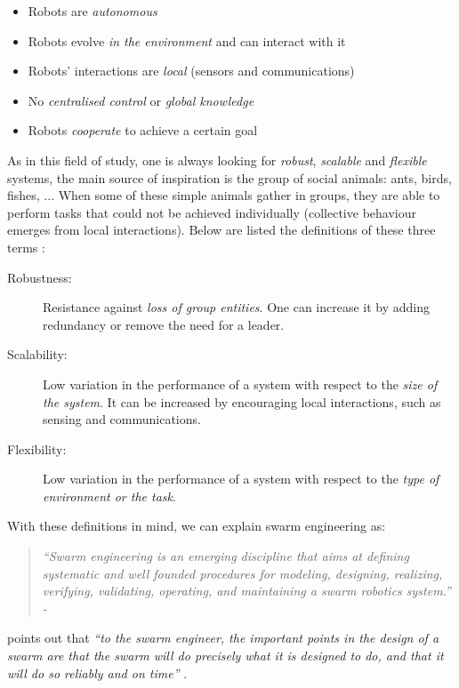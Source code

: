 \documentclass[oneside, a4paper, 12pt]{memoir}
\newcommand{\quoto}[2]{
\begin{quotation}
\textit{\enquote{#1} - #2}
\end{quotation}
}
\newcommand{\quot}[1]{\textit{\enquote{#1}}}
\begin{document}
\begin{itemize}
\item Robots are \emph{autonomous}
\item Robots evolve \emph{in the environment} and can interact with it
\item Robots' interactions are \emph{local} (sensors and communications)
\item No \emph{centralised control} or \emph{global knowledge}
\item Robots \emph{cooperate} to achieve a certain goal
\end{itemize}

As in this field of study, one is always looking for \emph{robust}, \emph{scalable} and \emph{flexible} systems, the main source of inspiration is the group of social animals: ants, birds, fishes, ... When some of these simple animals gather in groups, they are able to perform tasks that could not be achieved individually (collective behaviour emerges from local interactions). Below are listed the definitions of these three terms \citep{brambilla2013swarm}:

\label{def:robustness_scalability_flexibility}
\begin{description}
\item[Robustness:] Resistance against \emph{loss of group entities}. One can increase it by adding redundancy or remove the need for a leader.
\item[Scalability:] Low variation in the performance of a system with respect to the \emph{size of the system}. It can be increased by encouraging local interactions, such as sensing and communications.
\item[Flexibility:] Low variation in the performance of a system with respect to the \emph{type of environment or the task}.
\end{description}

With these definitions in mind, we can explain swarm engineering as:

\quoto{Swarm engineering is an emerging discipline that aims at defining systematic and well founded procedures for modeling, designing, realizing, verifying, validating, operating, and maintaining a swarm robotics system.}{\cite{brambilla2013swarm}}

\citet{kazadi2000swarm} points out that \quot{to the swarm engineer, the important points in the design of a swarm are that the swarm will do precisely what it is designed to do, and that it will do so reliably and on time} \citep{kazadi2000swarm}.
	
\end{document}
